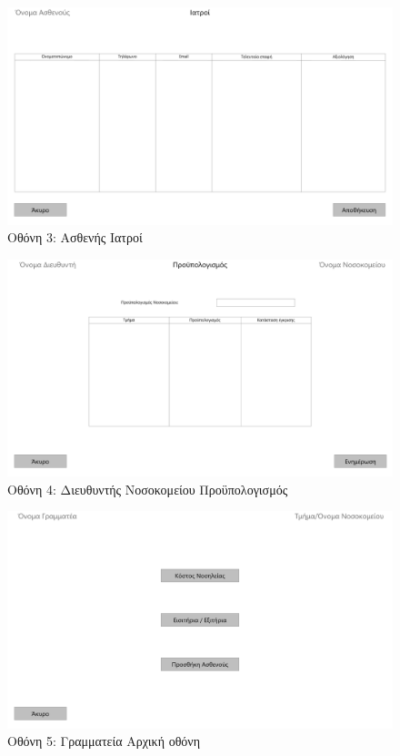 \documentclass[12pt,a4paper,oneside]{article}
\begin{document}
\newpage
\begin{figure}[h!]
\centering
\includegraphics[width=1.1\textwidth]{Ασθενής Ιατροί.pdf}
\captionsetup{labelformat=empty}
\caption{Οθόνη 3: Ασθενής Ιατροί}
\end{figure}

\begin{figure}[h!]
\centering
\includegraphics[width=1.1\textwidth]{Διευθυντής Νοσοκομείου Προϋπολογισμός.pdf}
\captionsetup{labelformat=empty}
\caption{Οθόνη 4: Διευθυντής Νοσοκομείου Προϋπολογισμός}
\end{figure}

\begin{figure}[h!]
\centering
\includegraphics[width=1.1\textwidth]{Γραμματεία Αρχική οθόνη.pdf}
\captionsetup{labelformat=empty}
\caption{Οθόνη 5: Γραμματεία Αρχική οθόνη}
\end{figure}
\end{document}
